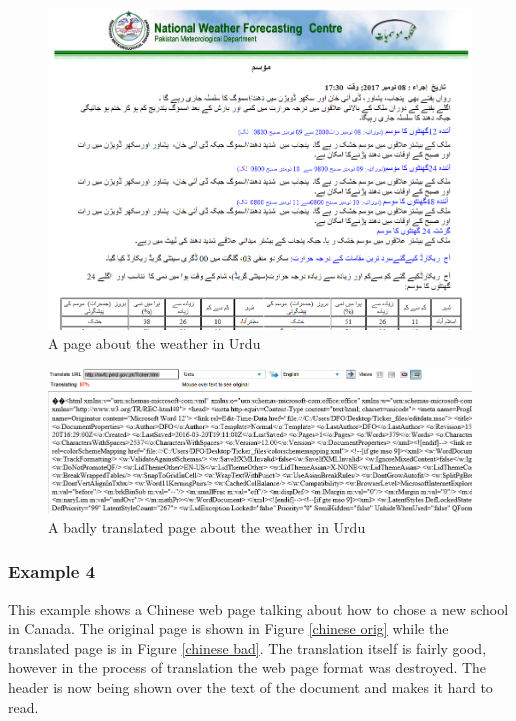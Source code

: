 \documentclass[letterpaper,12pt]{article}
\begin{document}
\begin{figure}[h]
\centering
\includegraphics[scale=0.5]{data/69urduWeatherOrig.png}
\caption{A page about the weather in Urdu}
\label{Urdu Original}
\end{figure}

\begin{figure}[h]
\centering
\includegraphics[scale=0.5]{data/69urduWeatherBad.png}
\caption{A badly translated page about the weather in Urdu}
\label{Urdu Bad}
\end{figure}

\subsubsection{Example 4}

This example shows a Chinese web page talking about how to chose a new school in Canada. The original page is shown in Figure \ref{chinese orig} while the translated page is in Figure \ref{chinese bad}. The translation itself is fairly good, however in the process of translation the web page format was destroyed. The header is now being shown over the text of the document and makes it hard to read.
\end{document}
